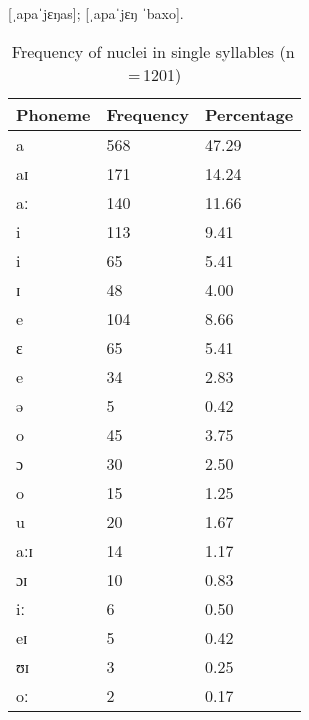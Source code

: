 \pex
	\a {} [ˌapaˈjɛŋas];
	\a {} [ˌapaˈjɛŋ ˈbaxo].
\xe

\begin{table}[pth]\centering
\caption[Frequency of nuclei in single syllables]{Frequency of nuclei in single syllables (n\,=\,1201)}
\begin{tabu} to 0.5\textwidth{X X[c] X[c]}
\tableheaderfont\toprule
Phoneme
	& Frequency
	& Percentage
	\\
	
\toprule

a
	& 568
	& 47.29\pct
	\\

aɪ
	& 171
	& 14.24\pct
	\\

aː
	& 140
	& 11.66\pct
	\\

\midrule

i
	& 113
	& 9.41\pct
	\\

\rowfont{\scriptsize\itshape}
\raggedleft
i
	& 65
	& 5.41\pct
	\\

\rowfont{\scriptsize\itshape}
\raggedleft
ɪ
	& 48
	& 4.00\pct
	\\

\midrule

e
	& 104
	& 8.66\pct
	\\

\rowfont{\scriptsize\itshape}
\raggedleft
ɛ
	& 65
	& 5.41\pct
	\\

\rowfont{\scriptsize\itshape}
\raggedleft
e
	& 34
	& 2.83\pct
	\\

\rowfont{\scriptsize\itshape}
\raggedleft
ə
	& 5
	& 0.42\pct
	\\

\midrule

o
	& 45
	& 3.75\pct
	\\

\rowfont{\scriptsize\itshape}
\raggedleft
ɔ
	& 30
	& 2.50\pct
	\\

\rowfont{\scriptsize\itshape}
\raggedleft
o
	& 15
	& 1.25\pct
	\\

\midrule

u
	& 20
	& 1.67\pct
	\\

aːɪ
	& 14
	& 1.17\pct
	\\

ɔɪ
	& 10
	& 0.83\pct
	\\

iː
	& 6
	& 0.50\pct
	\\

eɪ
	& 5
	& 0.42\pct
	\\

ʊɪ
	& 3
	& 0.25\pct
	\\

oː
	& 2
	& 0.17\pct
	\\

\bottomrule
\end{tabu}
\label{tab:singnuc}
\end{table}

